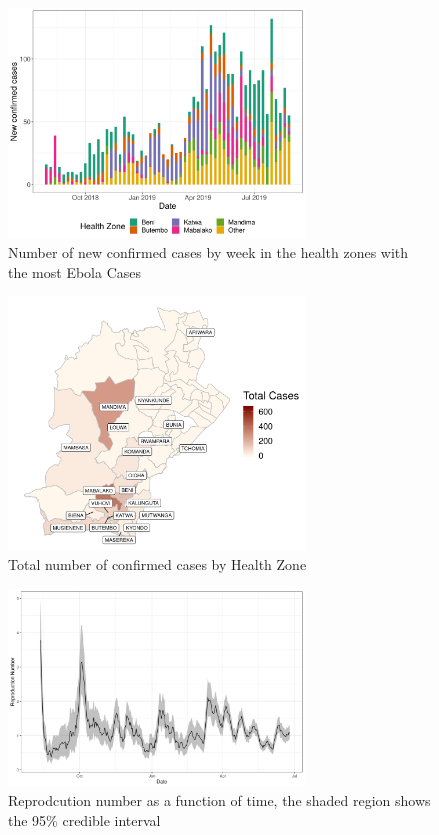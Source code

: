 \documentclass[12pt]{article}
\begin{document}
\begin{figure}[h]
  \centering
  \includegraphics[width=0.7\textwidth]{../output/epi_curve.png}
  \caption{Number of new confirmed cases by week in the health zones with the most Ebola Cases}
  \label{fig:epi_curve}
\end{figure}

\begin{figure}[h]
  \centering
  \includegraphics[width=0.7\textwidth]{../output/tot_map.png}

  \caption{Total number of confirmed cases by Health Zone}
  \label{fig:tot_map}
\end{figure}

\begin{figure}[h]
  \centering
  \includegraphics[width=0.7\textwidth]{../output/nat_rep.png}
  \caption{Reprodcution number as a function of time, the shaded region shows the 95\% credible interval}
  \label{fig:rep_num}
\end{figure}
\end{document}
